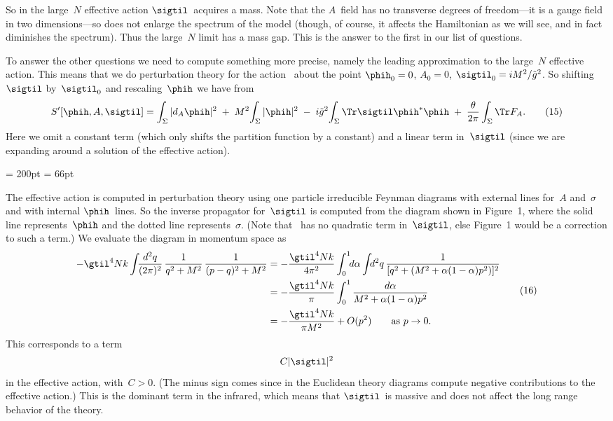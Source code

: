 So in the large~$N$ effective action $\sigtil $~acquires a mass.  Note that
the $A$~field has no transverse degrees of freedom---it is a gauge field in
two dimensions---so does not enlarge the spectrum of the model (though, of
course, it affects the Hamiltonian as we will see, and in fact diminishes the
spectrum).  Thus the large~$N$ limit
has a mass gap.  This is the answer to the first in our list of questions.
 
To answer the other questions we need to compute something more precise,
namely the leading approximation to the large~$N$ effective action.  This
means that we do perturbation theory for the action~ about the
point $\phih_0=0$, $A_0=0$, $\sigtil_0= iM^2/\tilde{g}^2$.  So
shifting~$\sigtil$ by~$\sigtil_0$ and rescaling~$\phih$ we have
from~
  $$ S'[\phih,A,\sigtil] = \int_{\Sigma} |d_A\phih|^2 \;+\; M^2\!\int_{\Sigma}
     |\phih|^2 \;-\;i\tilde{g}^2\!\int_{\Sigma } \Tr\sigtil\phih^*\phih \;+\;
     \frac{\theta }{2\pi }\int_{\Sigma }\Tr F_A. \tag{15} $$
Here we omit a constant term (which only shifts the partition function by a
constant) and a linear term in~$\sigtil$ (since we are expanding around a
solution of the effective action).  

 \midinsert
 \bigskip
 \centerline{
  \epsfxsize= 200pt
  \epsfysize= 66pt
 }
 \nobreak
 \endcaption
 \bigskip
 \endinsert

The effective action is computed in perturbation theory using one particle
irreducible Feynman diagrams with external lines for~$A$ and~$\sigma $ and
with internal $\phih$~lines.  So the inverse propagator for~$\sigtil$ is
computed from the diagram shown in Figure~1, where the solid line
represents~$\phih$ and the dotted line represents~$\sigma $.  (Note that
~has no quadratic term in~$\sigtil$, else Figure~1 would be a
correction to such a term.)  We evaluate the diagram in momentum space as
  $$ \aligned
      -\gtil^4Nk\int_{}\frac{d^2q}{(2\pi)^2}\,
     \frac{1}{q^2+M^2}\,\frac{1}{(p-q)^2 + M^2}
      &= -\frac{\gtil^4Nk}{4\pi ^2}\int_{0}^1 \!\!d\alpha
     \int_{}d^2q\,\frac{1}{[q^2 + (M^2 + \alpha (1-\alpha )p^2)]^2} \\
      &= -\frac{\gtil^4Nk}{\pi }\int_{0}^1\frac{d\alpha }{M^2 + \alpha
     (1-\alpha )p^2} \\
      &= - \frac{\gtil^4Nk}{\pi M^2} + O(p^2)\qquad
     \text{as~$p\to0$}.\endaligned \tag{16} $$
This corresponds to a term
  $$ C|\sigtil|^2 $$ 
in the effective action, with~$C>0$.  (The minus sign comes since in the
Euclidean theory diagrams compute negative contributions to the effective
action.)  This is the dominant term in the infrared, which means that
$\sigtil$~is massive and does not affect the long range behavior of the
theory.

